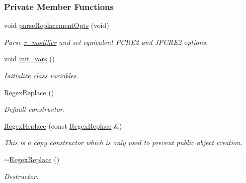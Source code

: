 \subsubsection*{Private Member Functions}
\begin{DoxyCompactItemize}
\item 
void \hyperlink{classjpcre2_1_1RegexReplace_aa31df9e8422dd9a767f2cc5fe4aaaf0e}{parse\+Replacement\+Opts} (void)
\begin{DoxyCompactList}\small\item\em Parse \hyperlink{classjpcre2_1_1RegexReplace_a3e6b848c7ad8f53cc17f49a6038930ec}{r\+\_\+modifier} and set equivalent P\+C\+R\+E2 and J\+P\+C\+R\+E2 options. \end{DoxyCompactList}\item 
void \hyperlink{classjpcre2_1_1RegexReplace_a462810e8fc902f09e475a164e81cc5f5}{init\+\_\+vars} ()\hypertarget{classjpcre2_1_1RegexReplace_a462810e8fc902f09e475a164e81cc5f5}{}\label{classjpcre2_1_1RegexReplace_a462810e8fc902f09e475a164e81cc5f5}

\begin{DoxyCompactList}\small\item\em Initialize class variables. \end{DoxyCompactList}\item 
\hyperlink{classjpcre2_1_1RegexReplace_ac50687b874800c827a6fa623b9b35753}{Regex\+Replace} ()
\begin{DoxyCompactList}\small\item\em Default constructor. \end{DoxyCompactList}\item 
\hyperlink{classjpcre2_1_1RegexReplace_a257d326d57af9ccbc7a45b002c34ed0a}{Regex\+Replace} (const \hyperlink{classjpcre2_1_1RegexReplace}{Regex\+Replace} \&)
\begin{DoxyCompactList}\small\item\em This is a copy constructor which is only used to prevent public object creation. \end{DoxyCompactList}\item 
\hyperlink{classjpcre2_1_1RegexReplace_ab27102839e7ff0914bcd204d750097ac}{$\sim$\+Regex\+Replace} ()
\begin{DoxyCompactList}\small\item\em Destructor. \end{DoxyCompactList}\end{DoxyCompactItemize}
